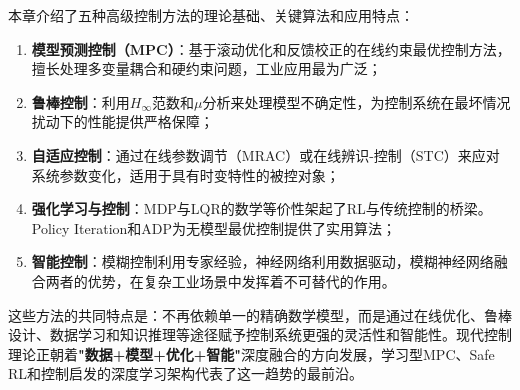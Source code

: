 本章介绍了五种高级控制方法的理论基础、关键算法和应用特点：

\begin{enumerate}
\item \textbf{模型预测控制（MPC）}：基于滚动优化和反馈校正的在线约束最优控制方法，擅长处理多变量耦合和硬约束问题，工业应用最为广泛；
\item \textbf{鲁棒控制}：利用\(H_{\infty}\)范数和\(\mu\)分析来处理模型不确定性，为控制系统在最坏情况扰动下的性能提供严格保障；
\item \textbf{自适应控制}：通过在线参数调节（MRAC）或在线辨识-控制（STC）来应对系统参数变化，适用于具有时变特性的被控对象；
\item \textbf{强化学习与控制}：MDP与LQR的数学等价性架起了RL与传统控制的桥梁。Policy Iteration和ADP为无模型最优控制提供了实用算法；
\item \textbf{智能控制}：模糊控制利用专家经验，神经网络利用数据驱动，模糊神经网络融合两者的优势，在复杂工业场景中发挥着不可替代的作用。
\end{enumerate}

这些方法的共同特点是：不再依赖单一的精确数学模型，而是通过在线优化、鲁棒设计、数据学习和知识推理等途径赋予控制系统更强的灵活性和智能性。现代控制理论正朝着\textbf{"数据+模型+优化+智能"}深度融合的方向发展，学习型MPC、Safe RL和控制启发的深度学习架构代表了这一趋势的最前沿。
